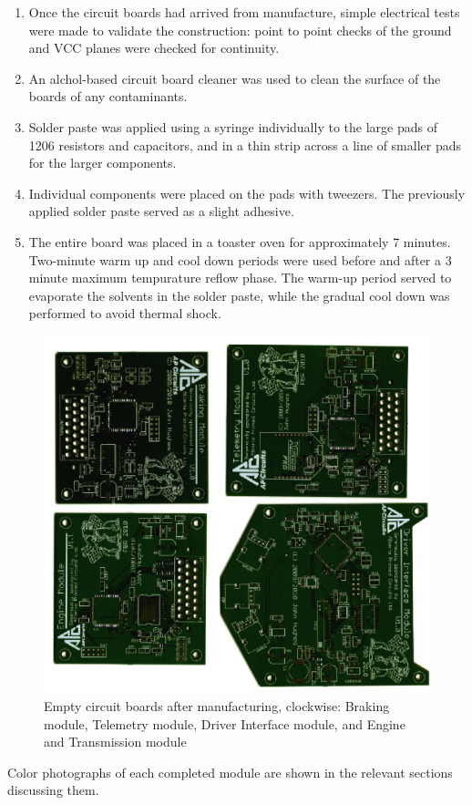 \begin{enumerate}
  \item Once the circuit boards had arrived from manufacture, simple electrical tests were made to validate the construction: point to point checks of the ground and VCC planes were checked for continuity.
  \item An alchol-based circuit board cleaner was used to clean the surface of the boards of any contaminants.
  \item Solder paste was applied using a syringe individually to the large pads of 1206 resistors and capacitors, and in a thin strip across a line of smaller pads for the larger components.
  \item Individual components were placed on the pads with tweezers. The previously applied solder paste served as a slight adhesive.
  \item The entire board was placed in a toaster oven for approximately 7 minutes. Two-minute warm up and cool down periods were used before and after a 3 minute maximum tempurature reflow phase. The warm-up period served to evaporate the solvents in the solder paste, while the gradual cool down was performed to avoid thermal shock.
\end{enumerate}

\begin{figure}[h]
 \centering
 \includegraphics[width=5in,keepaspectratio]{implementation/figures/empty_pcbs.eps}
 \caption{Empty circuit boards after manufacturing, clockwise: Braking module, Telemetry module, Driver Interface module, and Engine and Transmission module}
 \label{fig:empty_pcbs}
\end{figure}

Color photographs of each completed module are shown in the relevant sections discussing them.
